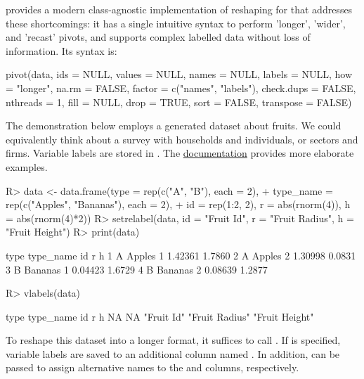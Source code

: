 \documentclass[article]{jss}
\begin{document}
 provides a modern class-agnostic implementation of reshaping for  that addresses these shortcomings: it has a single intuitive syntax to perform 'longer', 'wider', and 'recast' pivots, and supports complex labelled data without loss of information. Its syntax is:
%
\begin{Code}
pivot(data, ids = NULL, values = NULL, names = NULL, labels = NULL,
      how = "longer", na.rm = FALSE, factor = c("names", "labels"),
      check.dups = FALSE, nthreads = 1, fill = NULL, drop = TRUE,
      sort = FALSE, transpose = FALSE)
\end{Code}
%
The demonstration below employs a generated dataset about fruits. We could equivalently think about a survey with households and individuals, or sectors and firms. Variable labels are stored in . The \href{https://sebkrantz.github.io/collapse/reference/pivot.html#ref-examples}{documentation} provides more elaborate examples.
%
\begin{Schunk}
\begin{Sinput}
R> data <- data.frame(type = rep(c("A", "B"), each = 2),
+              type_name = rep(c("Apples", "Bananas"), each = 2),
+              id = rep(1:2, 2), r = abs(rnorm(4)), h = abs(rnorm(4)*2))
R> setrelabel(data, id = "Fruit Id", r = "Fruit Radius", h = "Fruit Height")
R> print(data)
\end{Sinput}
\begin{Soutput}
  type type_name id       r      h
1    A    Apples  1 1.42361 1.7860
2    A    Apples  2 1.30998 0.0831
3    B   Bananas  1 0.04423 1.6729
4    B   Bananas  2 0.08639 1.2877
\end{Soutput}
\begin{Sinput}
R> vlabels(data)
\end{Sinput}
\begin{Soutput}
          type      type_name             id              r              h 
            NA             NA     "Fruit Id" "Fruit Radius" "Fruit Height" 
\end{Soutput}
\end{Schunk}
%
To reshape this dataset into a longer format, it suffices to call . If  is specified, variable labels are saved to an additional column named . In addition,  can be passed to assign alternative names to the  and  columns, respectively.
%
\end{document}
